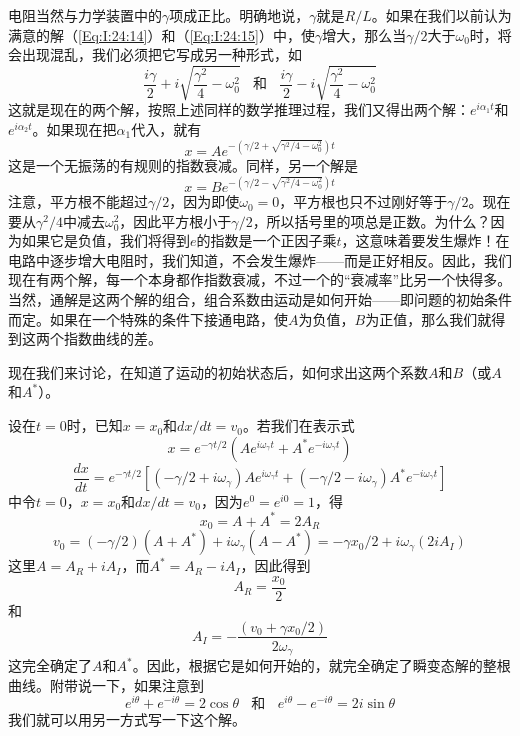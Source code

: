 电阻当然与力学装置中的$\gamma$项成正比。明确地说，$\gamma$就是$R/L$。如果在我们以前认为满意的解（\ref{Eq:I:24:14}）和（\ref{Eq:I:24:15}）中，使$\gamma$增大，那么当$\gamma/2$大于$\omega_0$时，将会出现混乱，我们必须把它写成另一种形式，如
\begin{equation*}
    \frac{i\gamma}{2} + i\sqrt{\frac{\gamma^2}{4} - \omega_0^2} ~~~~\text{和}~~~~
    \frac{i\gamma}{2} - i\sqrt{\frac{\gamma^2}{4} - \omega_0^2}
\end{equation*}
这就是现在的两个解，按照上述同样的数学推理过程，我们又得出两个解：$e^{i\alpha_1t}$和$e^{i\alpha_2t}$。如果现在把$\alpha_1$代入，就有
\begin{equation*}
    x=Ae^{-(\gamma/2+\sqrt{\gamma^2/4-\omega_0^2})t}
\end{equation*}
这是一个无振荡的有规则的指数衰减。同样，另一个解是
\begin{equation*}
    x=Be^{-(\gamma/2-\sqrt{\gamma^2/4-\omega_0^2})t}
\end{equation*}
注意，平方根不能超过$\gamma/2$，因为即使$\omega_0=0$，平方根也只不过刚好等于$\gamma/2$。现在要从$\gamma^2/4$中减去$\omega_0^2$，因此平方根小于$\gamma/2$，所以括号里的项总是正数。为什么？因为如果它是负值，我们将得到$e$的指数是一个正因子乘$t$，这意味着要发生爆炸！在电路中逐步增大电阻时，我们知道，不会发生爆炸——而是正好相反。因此，我们现在有两个解，每一个本身都作指数衰减，不过一个的“衰减率”比另一个快得多。当然，通解是这两个解的组合，组合系数由运动是如何开始——即问题的初始条件而定。如果在一个特殊的条件下接通电路，使$A$为负值，$B$为正值，那么我们就得到这两个指数曲线的差。

现在我们来讨论，在知道了运动的初始状态后，如何求出这两个系数$A$和$B$（或$A$和$A^*$）。

设在$t=0$时，已知$x=x_0$和$dx/dt=v_0$。若我们在表示式
\begin{equation*}
    x=e^{-\gamma t/2}(Ae^{i\omega_\gamma t}+A^*e^{-i\omega_\gamma t})
\end{equation*}
\begin{equation*}
    \frac{dx}{dt}=e^{-\gamma t/2}[(-\gamma/2 + i\omega_\gamma)Ae^{i\omega_\gamma t}+(-\gamma/2 - i\omega_\gamma)A^*e^{-i\omega_\gamma t}]
\end{equation*}
中令$t=0$，$x=x_0$和$dx/dt=v_0$，因为$e^0=e^{i0}=1$，得
\begin{equation*}
    x_0=A+A^*=2A_R
\end{equation*}
\begin{equation*}
    v_0=(-\gamma/2)(A+A^*)+i\omega_\gamma(A-A^*) = -\gamma x_0/2+i\omega_\gamma(2iA_I)
\end{equation*}
这里$A=A_R+iA_I$，而$A^*=A_R-iA_I$，因此得到
\begin{equation*}
    A_R=\frac{x_0}{2}
\end{equation*}
和
\begin{equation}
    \label{Eq:I:24:21}
    A_I=-\frac{(v_0+\gamma x_0/2)}{2\omega_\gamma}
\end{equation}
这完全确定了$A$和$A^*$。因此，根据它是如何开始的，就完全确定了瞬变态解的整根曲线。附带说一下，如果注意到
\begin{equation*}
    e^{i\theta}+e^{-i\theta}=2\cos\theta ~~~~\text{和}~~~~  e^{i\theta}-e^{-i\theta}=2i\sin\theta
\end{equation*}
我们就可以用另一方式写一下这个解。

